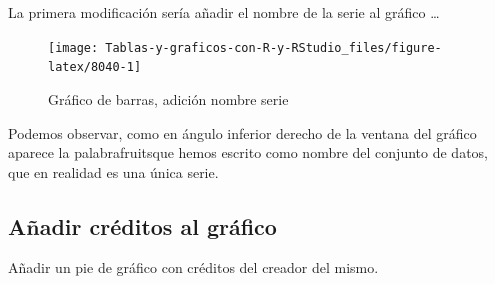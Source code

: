 \documentclass[
]{book}
\newenvironment{Shaded}{\begin{snugshade}}{\end{snugshade}}
\newcommand{\AttributeTok}[1]{\textcolor[rgb]{0.77,0.63,0.00}{#1}}
\newcommand{\ConstantTok}[1]{\textcolor[rgb]{0.00,0.00,0.00}{#1}}
\newcommand{\FunctionTok}[1]{\textcolor[rgb]{0.00,0.00,0.00}{#1}}
\newcommand{\NormalTok}[1]{#1}
\newcommand{\SpecialCharTok}[1]{\textcolor[rgb]{0.00,0.00,0.00}{#1}}
\newcommand{\StringTok}[1]{\textcolor[rgb]{0.31,0.60,0.02}{#1}}
\begin{document}
La primera modificación sería añadir el nombre de la serie al gráfico \ldots{}

\begin{Shaded}
\end{Shaded}

\begin{figure}[H]

{\centering \texttt{[image: Tablas-y-graficos-con-R-y-RStudio\_files/figure-latex/8040-1]} 

}

\caption{Gráfico de barras, adición nombre serie}\label{fig:8040}
\end{figure}

Podemos observar, como en ángulo inferior derecho de la ventana del gráfico aparece la palabrafruitsque hemos escrito como nombre del conjunto de datos, que en realidad es una única serie.

\hypertarget{auxf1adir-cruxe9ditos-al-gruxe1fico}{%
\subsection{Añadir créditos al gráfico}\label{auxf1adir-cruxe9ditos-al-gruxe1fico}}

Añadir un pie de gráfico con créditos del creador del mismo.

\begin{Shaded}
\end{Shaded}
\end{document}
